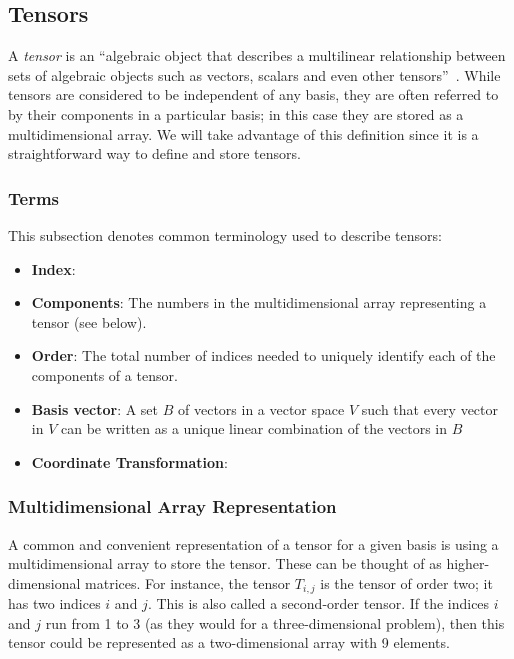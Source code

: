 \documentclass[12pt]{article}
\begin{document}
\subsection{Tensors}
A \textit{tensor} is an ``algebraic object that describes a multilinear
relationship between sets of algebraic objects such as vectors, scalars
and even other tensors''~\citep{Wikipedia_Tensors_2025}. While tensors
are considered to be independent of any basis, they are often referred
to by their components in a particular basis; in this case they are
stored as a multidimensional array. We will take advantage of this 
definition since it is a straightforward way to define and store tensors.

\subsubsection{Terms}
This subsection denotes common terminology used to describe tensors:

\begin{itemize}
\item \textbf{Index}: 
\item \textbf{Components}: The numbers in the multidimensional array representing a
      tensor (see below).
\item \textbf{Order}: The total number of indices needed to uniquely identify each of the 
      components of a tensor.
\item \textbf{Basis vector}: A set $B$ of vectors in a vector space $V$ such that every 
      vector in $V$ can be written as a unique linear combination of the vectors 
      in $B$~\citep{Wikipedia_Basis_2025}
\item \textbf{Coordinate Transformation}: 
\end{itemize}

\subsubsection{Multidimensional Array Representation}
A common and convenient representation of a tensor for a given basis is using a 
multidimensional array to store the tensor. These can be thought of as higher-dimensional
matrices. For instance, the tensor $T_{i,j}$ is
the tensor of order two; it has two indices $i$ and $j$. This is also called a
second-order tensor. If the indices $i$ and $j$ run from 1 to 3 (as they would for
a three-dimensional problem), then this tensor could be represented as a two-dimensional
array with 9 elements.
\end{document}
